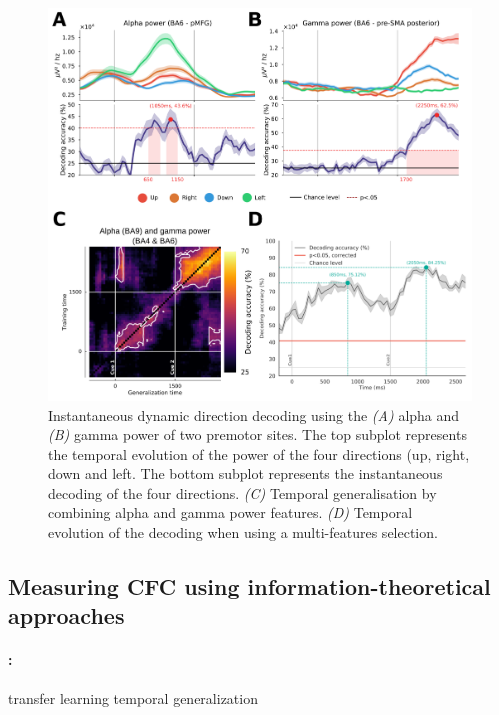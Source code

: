 \documentclass[a4paper,11pt]{article}
\begin{document}
\begin{figure}[H]
\centering
    \includegraphics[width=.8\linewidth]{figures/report/combrisson_2030_dir.png}
    \caption{Instantaneous dynamic direction decoding using the \textit{(A)} alpha and \textit{(B)} gamma power of two premotor sites. The top subplot represents the temporal evolution of the power of the four directions (up, right, down and left. The bottom subplot represents the instantaneous decoding of the four directions. \textit{(C)} Temporal generalisation by combining alpha and gamma power features. \textit{(D)} Temporal evolution of the decoding when using a multi-features selection.}
    \label{fig_dir_decoding}
\end{figure}



\begin{multicols}{2}

\subsection{Measuring CFC using information-theoretical approaches}

\paragraph{\cite{combrisson2020tensorpac} :} transfer learning temporal generalization

\end{multicols}

\end{document}
